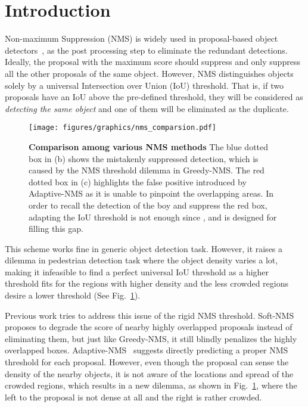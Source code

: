 \documentclass[sigconf]{acmart}
\begin{document}
\section{Introduction}



Non-maximum Suppression (NMS) is widely used in proposal-based object detectors~\cite{yolo-v1, yolo-v2, yolo-v3, ssd, dssd, rcnn, fast-rcnn, faster-rcnn, fpn, mask-rcnn, cascade-rcnn, rfcn, deformable, focal-loss}, as the post processing step to eliminate the redundant detections. Ideally, the proposal with the maximum score should suppress and only suppress all the other proposals of the same object. However, NMS distinguishes objects solely by a universal Intersection over Union (IoU) threshold. That is, if two proposals have an IoU above the pre-defined threshold, they will be considered as \textit{detecting the same object} and one of them will be eliminated as the duplicate.

\begin{figure}[t]
\begin{center}
\texttt{[image: figures/graphics/nms\_comparsion.pdf]}
\end{center}
\vspace{-0.3cm}
\caption{\textbf{Comparison among various NMS methods} {\normalfont The blue dotted box in (b) shows the mistakenly suppressed detection, which is caused by the NMS threshold dilemma in Greedy-NMS. The red dotted box in (c) highlights the false positive introduced by Adaptive-NMS as it is unable to pinpoint the overlapping areas. In order to recall the detection of the boy and suppress the red box, adapting the IoU threshold is not enough since , and \heatmapnameshort{} is designed for filling this gap.}}
\vspace{-0.3cm}
\label{fig:intro}
\end{figure}
%
 This scheme works fine in generic object detection task. However, it raises a dilemma in pedestrian detection task where the object density varies a lot, making it infeasible to find a perfect universal IoU threshold as a higher threshold fits for the regions with higher density and the less crowded regions desire a lower threshold (See Fig.~\ref{fig:intro}).

Previous work tries to address this issue of the rigid NMS threshold. Soft-NMS~\cite{soft-nms} proposes to degrade the score of nearby highly overlapped proposals instead of eliminating them, but just like Greedy-NMS, it still blindly penalizes the highly overlapped boxes. Adaptive-NMS~\cite{adaptive-nms} suggests directly predicting a proper NMS threshold for each proposal. However, even though the proposal can sense the density of the nearby objects, it is not aware of the locations and spread of the crowded regions, which results in a new dilemma, as shown in Fig.~\ref{fig:intro}, where the left to the proposal is not dense at all and the right is rather crowded.
\end{document}
